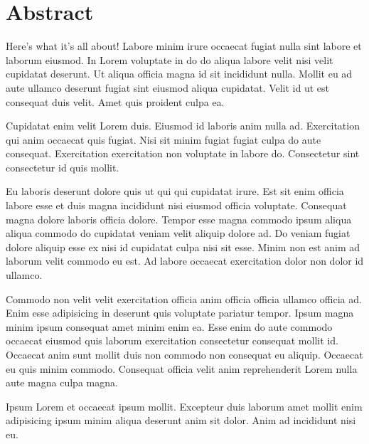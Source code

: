 \chapter{Abstract}

Here's what it's all about! Labore minim irure occaecat fugiat nulla sint labore et laborum eiusmod. In Lorem voluptate in do do aliqua labore velit nisi velit cupidatat deserunt. Ut aliqua officia magna id sit incididunt nulla. Mollit eu ad aute ullamco deserunt fugiat sint eiusmod aliqua cupidatat. Velit id ut est consequat duis velit. Amet quis proident culpa ea.

Cupidatat enim velit Lorem duis. Eiusmod id laboris anim nulla ad. Exercitation qui anim occaecat quis fugiat. Nisi sit minim fugiat fugiat culpa do aute consequat. Exercitation exercitation non voluptate in labore do. Consectetur sint consectetur id quis mollit.

Eu laboris deserunt dolore quis ut qui qui cupidatat irure. Est sit enim officia labore esse et duis magna incididunt nisi eiusmod officia voluptate. Consequat magna dolore laboris officia dolore. Tempor esse magna commodo ipsum aliqua aliqua commodo do cupidatat veniam velit aliquip dolore ad. Do veniam fugiat dolore aliquip esse ex nisi id cupidatat culpa nisi sit esse. Minim non est anim ad laborum velit commodo eu est. Ad labore occaecat exercitation dolor non dolor id ullamco.

Commodo non velit velit exercitation officia anim officia officia ullamco officia ad. Enim esse adipisicing in deserunt quis voluptate pariatur tempor. Ipsum magna minim ipsum consequat amet minim enim ea. Esse enim do aute commodo occaecat eiusmod quis laborum exercitation consectetur consequat mollit id. Occaecat anim sunt mollit duis non commodo non consequat eu aliquip. Occaecat eu quis minim commodo. Consequat officia velit anim reprehenderit Lorem nulla aute magna culpa magna.

Ipsum Lorem et occaecat ipsum mollit. Excepteur duis laborum amet mollit enim adipisicing ipsum minim aliqua deserunt anim sit dolor. Anim ad incididunt nisi eu.


